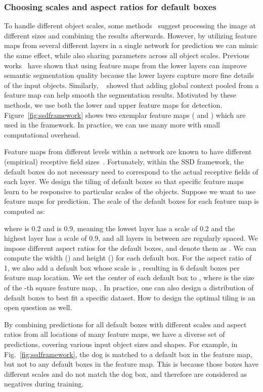 \documentclass[runningheads]{llncs}
\begin{document}
\subsubsection{Choosing scales and aspect ratios for default boxes}
\label{sec:defaultboxes}
To handle different object scales, some methods~\cite{sermanet2013overfeat,he2014spatial} suggest processing the image at different sizes and combining the results afterwards. However, by utilizing feature maps from several different layers in a single network for prediction we can mimic the same effect, while also sharing parameters across all object scales. Previous works~\cite{long2014fully,hariharan2014hypercolumns} have shown that using feature maps from the lower layers can improve semantic segmentation quality because the lower layers capture more fine details of the input objects. Similarly, ~\cite{liu2015parsenet} showed that adding global context pooled from a feature map can help smooth the segmentation results. Motivated by these methods, we use both the lower and upper feature maps for detection. Figure~\ref{fig:ssdframework} shows two exemplar feature maps ( and ) which are used in the framework. In practice, we can use many more with small computational overhead.

Feature maps from different levels within a network are known to have different (empirical) receptive field sizes~\cite{zhou2014object}. Fortunately, within the SSD framework, the default boxes do not necessary need to correspond to the actual receptive fields of each layer.
We design the tiling of default boxes so that specific feature maps learn to be responsive to particular scales of the objects. Suppose we want to use  feature maps for prediction. The scale of the default boxes for each feature map is computed as:

where  is 0.2 and  is 0.9, meaning the lowest layer has a scale of 0.2 and the highest layer has a scale of 0.9, and all layers in between are regularly spaced. We impose different aspect ratios for the default boxes, and denote them as . We can compute the width () and height () for each default box. For the aspect ratio of 1, we also add a default box whose scale is , resulting in 6 default boxes per feature map location. We set the center of each default box to , where  is the size of the -th square feature map, . In practice, one can also design a distribution of default boxes to best fit a specific dataset. How to design the optimal tiling is an open question as well.

By combining predictions for all default boxes with different scales and aspect ratios from all locations of many feature maps, we have a diverse set of predictions, covering various input object sizes and shapes. For example, in Fig.~\ref{fig:ssdframework}, the dog is matched to a default box in the  feature map, but not to any default boxes in the  feature map. This is because those boxes have different scales and do not match the dog box, and therefore are considered as negatives during training.
\vspace{-1em}
\end{document}
